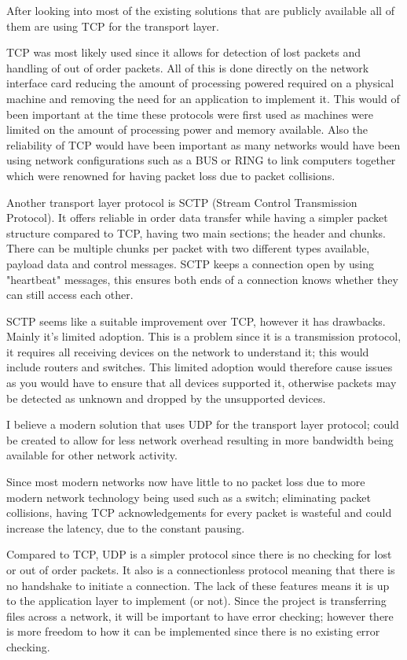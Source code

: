 After looking into most of the existing solutions that are publicly available all of them are using TCP for the transport layer.

TCP was most likely used since it allows for detection of lost packets and handling of out of order packets. All of this is done directly on the network interface card reducing the amount of processing powered required on a physical machine and removing the need for an application to implement it. This would of been important at the time these protocols were first used as machines were limited on the amount of processing power and memory available. Also the reliability of TCP would have been important as many networks would have been using network configurations such as a BUS or RING to link computers together which were renowned for having packet loss due to packet collisions.

Another transport layer protocol is SCTP (Stream Control Transmission Protocol). It offers reliable in order data transfer while having a simpler packet structure compared to TCP, having two main sections; the header and chunks. There can be multiple chunks per packet with two different types available, payload data and control messages. SCTP keeps a connection open by using "heartbeat" messages, this ensures both ends of a connection knows whether they can still access each other.

SCTP seems like a suitable improvement over TCP, however it has drawbacks. Mainly it's limited adoption. This is a problem since it is a transmission protocol, it requires all receiving devices on the network to understand it; this would include routers and switches. This limited adoption would therefore cause issues as you would have to ensure that all devices supported it, otherwise packets may be detected as unknown and dropped by the unsupported devices.

I believe a modern solution that uses UDP for the transport layer protocol; could be created to allow for less network overhead resulting in more bandwidth being available for other network activity.

Since most modern networks now have little to no packet loss due to more modern network technology being used such as a switch; eliminating packet collisions, having TCP acknowledgements for every packet is wasteful and could increase the latency, due to the constant pausing.

Compared to TCP, UDP is a simpler protocol since there is no checking for lost or out of order packets. It also is a connectionless protocol meaning that there is no handshake to initiate a connection. The lack of these features means it is up to the application layer to implement (or not). Since the project is transferring files across a network, it will be important to have error checking; however there is more freedom to how it can be implemented since there is no existing error checking.


